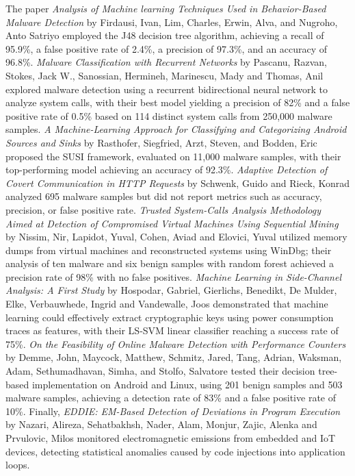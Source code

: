The paper \textit{Analysis of Machine learning Techniques Used in Behavior-Based Malware Detection} by Firdausi, Ivan, Lim, Charles, Erwin, Alva, and Nugroho, Anto Satriyo employed the J48 decision tree algorithm, achieving a recall of 95.9\%, a false positive rate of 2.4\%, a precision of 97.3\%, and an accuracy of 96.8\%. \textit{Malware Classification with Recurrent Networks}\cite{7178304} by Pascanu, Razvan, Stokes, Jack W., Sanossian, Hermineh, Marinescu, Mady and Thomas, Anil explored malware detection using a recurrent bidirectional neural network to analyze system calls, with their best model yielding a precision of 82\% and a false positive rate of 0.5\% based on 114 distinct system calls from 250,000 malware samples. \textit{A Machine-Learning Approach for Classifying and Categorizing Android Sources and Sinks}\cite{rasthofer2014machine} by Rasthofer, Siegfried, Arzt, Steven, and Bodden, Eric proposed the SUSI framework, evaluated on 11,000 malware samples, with their top-performing model achieving an accuracy of 92.3\%. \textit{Adaptive Detection of Covert Communication in HTTP Requests}\cite{6377758} by Schwenk, Guido and Rieck, Konrad analyzed 695 malware samples but did not report metrics such as accuracy, precision, or false positive rate. \textit{Trusted System-Calls Analysis Methodology Aimed at Detection of Compromised Virtual Machines Using Sequential Mining}\cite{10.1016/j.knosys.2018.04.033} by Nissim, Nir, Lapidot, Yuval, Cohen, Aviad and Elovici, Yuval utilized memory dumps from virtual machines and reconstructed systems using WinDbg; their analysis of ten malware and six benign samples with random forest achieved a precision rate of 98\% with no false positives. \textit{Machine Learning in Side-Channel Analysis: A First Study}\cite{hospodar2011machine} by Hospodar, Gabriel, Gierlichs, Benedikt, De Mulder, Elke, Verbauwhede, Ingrid and Vandewalle, Joos demonstrated that machine learning could effectively extract cryptographic keys using power consumption traces as features, with their LS-SVM linear classifier reaching a success rate of 75\%. \textit{On the Feasibility of Online Malware Detection with Performance Counters}\cite{10.1145/2508148.2485970} by Demme, John, Maycock, Matthew, Schmitz, Jared, Tang, Adrian, Waksman, Adam, Sethumadhavan, Simha, and Stolfo, Salvatore tested their decision tree-based implementation on Android and Linux, using 201 benign samples and 503 malware samples, achieving a detection rate of 83\% and a false positive rate of 10\%. Finally, \textit{EDDIE: EM-Based Detection of Deviations in Program Execution}\cite{10.1145/3079856.3080223} by Nazari, Alireza, Sehatbakhsh, Nader, Alam, Monjur, Zajic, Alenka and Prvulovic, Milos monitored electromagnetic emissions from embedded and IoT devices, detecting statistical anomalies caused by code injections into application loops.

